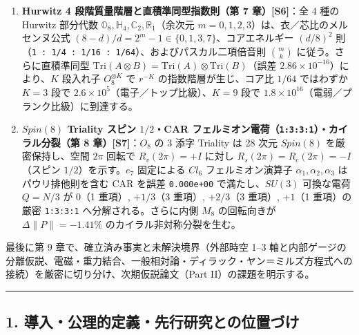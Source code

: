 \documentclass[
  a4paper,
]{ltjsarticle}
\begin{document}
\begin{enumerate}
  \texttt{0.7878}）を生み、臨界点 \(\epsilon_c \in (0.270, 0.275)\)
  で遠方空間切断崩壊（\texttt{nz:\ 576\ \$\textbackslash{}to\$\ 16},
  \(\|P\| \to 1/2\)）を起こす。同時に厳密反証監査により、弱結合背景の複素位相は
  \(|\Delta\theta| < 10^{-9}\) rad に単一時計ロックする一方、スピン
  2（\(\sigma_x\)）モードが背景時計全体を
  \(0.6579\)（\(d_1 = 1/\sqrt{2}\)）へ引きずり込むことを確定した。
\item
  \textbf{Hurwitz 4 段階質量階層と直積準同型指数則（第 7
  章）{[}S6{]}}：全 4 種の Hurwitz 部分代数
  \(\mathbb{O}_8, \mathbb{H}_4, \mathbb{C}_2, \mathbb{R}_1\)（余次元
  \(m = 0,1,2,3\)）は、衣／芯比のメルセンヌ公式
  \((8-d)/d = 2^m - 1 \in \{0,1,3,7\}\)、コアエネルギー \((d/8)^2\)
  則（\texttt{1\ :\ 1/4\ :\ 1/16\ :\ 1/64}）、およびパスカル二項倍音則
  \(\binom{m}{k}\) に従う。さらに直積準同型
  \(\mathrm{Tri}(A\otimes B) = \mathrm{Tri}(A)\otimes\mathrm{Tri}(B)\)（誤差
  \(2.86\times 10^{-16}\)）により、\(K\) 段入れ子 \(O_8^{\otimes K}\) で
  \(r^{-K}\) の指数階層が生じ、コア比 \(1/64\) ではわずか \(K=3\) 段で
  \(2.6\times 10^5\)（電子／トップ比級）、\(K=9\) 段で
  \(1.8\times 10^{16}\)（電弱／プランク比級）に到達する。
\item
  \textbf{\(Spin(8)\) Triality スピン \(1/2\)・CAR
  フェルミオン電荷（\texttt{1:3:3:1}）・カイラル分裂（第 8
  章）{[}S7{]}}：\(O_8\) の 3 添字 Triality は 28 次元 \(Spin(8)\)
  を厳密保持し、空間 \(2\pi\) 回転で \(R_v(2\pi)=+I\) に対し
  \(R_s(2\pi)=R_c(2\pi)=-I\)（スピン \(1/2\)）を示す。\(e_7\) 固定による
  \(Cl_6\) フェルミオン演算子 \(\alpha_1,\alpha_2,\alpha_3\)
  はパウリ排他則を含む CAR を誤差 \texttt{0.000e+00} で満たし、\(SU(3)\)
  可換な電荷 \(Q=N/3\) が \(0\)（1 重項）, \(+1/3\)（3 重項）,
  \(+2/3\)（3 重項）, \(+1\)（1 重項）の厳密 \texttt{1:3:3:1}
  へ分解される。さらに内側 \(M_8\) の回転向きが
  \(\Delta\|P\| = -1.41\%\) のカイラル非対称分裂を生む。
\end{enumerate}

最後に第 9 章で、確立済み事実と未解決境界（外部時空 1--3
軸と内部ゲージの分離仮説、電磁・重力結合、一般相対論・ディラック・ヤン＝ミルズ方程式への接続）を厳密に切り分け、次期仮説論文（Part
II）の課題を明示する。

\begin{center}\rule{0.5\linewidth}{0.5pt}\end{center}

\subsection{1.
導入・公理的定義・先行研究との位置づけ}\label{ux5c0eux5165ux516cux7406ux7684ux5b9aux7fa9ux5148ux884cux7814ux7a76ux3068ux306eux4f4dux7f6eux3065ux3051}
\end{document}
